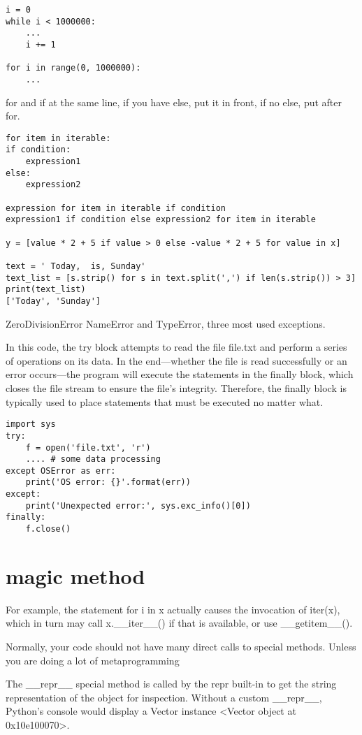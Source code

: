 \documentclass[a4paper,12pt,twoside]{book}
\begin{document}
\begin{lstlisting}
i = 0
while i < 1000000: 
	...
	i += 1
	
for i in range(0, 1000000):
	...
\end{lstlisting}

for and if at the same line, if you have else, put it in front, if no else, put after for.

\begin{lstlisting}
for item in iterable:
if condition:
	expression1
else:
	expression2	
	
expression for item in iterable if condition
expression1 if condition else expression2 for item in iterable

y = [value * 2 + 5 if value > 0 else -value * 2 + 5 for value in x]

text = ' Today,  is, Sunday'
text_list = [s.strip() for s in text.split(',') if len(s.strip()) > 3]
print(text_list)
['Today', 'Sunday']
\end{lstlisting}

ZeroDivisionError NameError and TypeError, three most used exceptions.

In this code, the try block attempts to read the file file.txt and perform a series of operations on its data. In the end—whether the file is read successfully or an error occurs—the program will execute the statements in the finally block, which closes the file stream to ensure the file’s integrity. Therefore, the finally block is typically used to place statements that must be executed no matter what.

\begin{lstlisting}
import sys
try:
	f = open('file.txt', 'r')
	.... # some data processing
except OSError as err:
	print('OS error: {}'.format(err))
except:
	print('Unexpected error:', sys.exc_info()[0])
finally:
	f.close()
\end{lstlisting}

\section{magic method}
For example, the statement for i in x actually causes the invocation of
iter(x), which in turn may call x.\_\_iter\_\_() if that is available, or use \_\_getitem\_\_().

Normally, your code should not have many direct calls to special methods. Unless
you are doing a lot of metaprogramming

The \_\_repr\_\_ special method is called by the repr built-in to get the string representation
of the object for inspection. Without a custom \_\_repr\_\_, Python’s console
would display a Vector instance <Vector object at 0x10e100070>.
\end{document}
